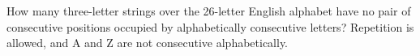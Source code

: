 How many three-letter strings over the 26-letter English alphabet have no pair of consecutive positions occupied by alphabetically consecutive letters? Repetition is allowed, and A and Z are not consecutive alphabetically.
